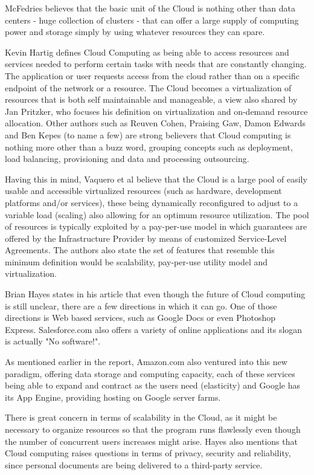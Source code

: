 McFedries believes that the basic unit of the Cloud is nothing other than data centers - huge collection of clusters - that can offer a large supply of computing power and storage simply by using whatever resources they can spare.\cite{ieees}

Kevin Hartig defines Cloud Computing as being able to access resources and services needed to perform certain tasks with needs that are constantly changing. The application or user requests access from the cloud rather than on a specific endpoint of the network or a resource. The Cloud becomes a virtualization of resources that is both self maintainable and manageable, a view also shared by Jan Pritzker, who focuses his definition on virtualization and on-demand resource allocation. Other authors such as Reuven Cohen, Praising Gaw, Damon Edwards and Ben Kepes (to name a few) are strong believers that Cloud computing is nothing more other than a buzz word, grouping concepts such as deployment, load balancing, provisioning and data and processing outsourcing.\cite{21experts}

Having this in mind, Vaquero et al believe that the Cloud is a large pool of easily usable and accessible virtualized resources (such as hardware, development platforms and/or services), these being dynamically reconfigured to adjust to a variable load (scaling) also allowing for an optimum resource utilization. The pool of resources is typically exploited by a pay-per-use model in which guarantees are offered by the Infrastructure Provider by means of customized Service-Level Agreements. The authors also state the set of features that resemble this minimum definition would be scalability, pay-per-use utility model and virtualization. \cite{vaquero}

Brian Hayes states in his article that even though the future of Cloud computing is still unclear, there are a few directions in which it can go. One of those directions is Web based services, such as Google Docs or even Photoshop Express. Salesforce.com also offers a variety of online applications and its slogan is actually "No software!". 

As mentioned earlier in the report, Amazon.com also ventured into this new paradigm, offering data storage and computing capacity, each of these services being able to expand and contract as the users need (elasticity) and Google has its App Engine, providing hosting on Google server farms.

There is great concern in terms of scalability in the Cloud, as it might be necessary to organize resources so that the program runs flawlessly even though the number of concurrent users increases might arise. Hayes also mentions that Cloud computing raises questions in terms of privacy, security and reliability, since personal documents are being delivered to a third-party service.\cite{hayes}

